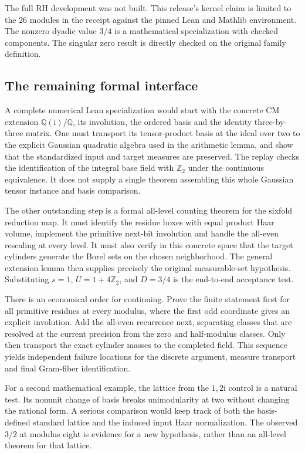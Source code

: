 \documentclass[12pt,letterpaper]{article}
\begin{document}
The full RH development was not built. This release's kernel claim is limited to the 26 modules in the receipt against the pinned Lean and Mathlib environment. The nonzero dyadic value \(3/4\) is a mathematical specialization with checked components. The singular zero result is directly checked on the original family definition.

\clearpage\subsection{The remaining formal interface}
A complete numerical Lean specialization would start with the concrete CM extension \(\mathbb Q(\mathrm i)/\mathbb Q\), its involution, the ordered basis and the identity three-by-three matrix. One must transport its tensor-product basis at the ideal over two to the explicit Gaussian quadratic algebra used in the arithmetic lemma, and show that the standardized input and target measures are preserved. The replay checks the identification of the integral base field with \(\mathbb Z_2\) under the continuous equivalence. It does not supply a single theorem assembling this whole Gaussian tensor instance and basis comparison.

The other outstanding step is a formal all-level counting theorem for the sixfold reduction map. It must identify the residue boxes with equal product Haar volume, implement the primitive next-bit involution and handle the all-even rescaling at every level. It must also verify in this concrete space that the target cylinders generate the Borel sets on the chosen neighborhood. The general extension lemma then supplies precisely the original measurable-set hypothesis. Substituting \(s=1\), \(U=1+4\mathbb Z_2\), and \(D=3/4\) is the end-to-end acceptance test.

There is an economical order for continuing. Prove the finite statement first for all primitive residues at every modulus, where the first odd coordinate gives an explicit involution. Add the all-even recurrence next, separating classes that are resolved at the current precision from the zero and half-modulus classes. Only then transport the exact cylinder masses to the completed field. This sequence yields independent failure locations for the discrete argument, measure transport and final Gram-fiber identification.

For a second mathematical example, the lattice from the \(1,2\mathrm i\) control is a natural test. Its nonunit change of basis breaks unimodularity at two without changing the rational form. A serious comparison would keep track of both the basis-defined standard lattice and the induced input Haar normalization. The observed \(3/2\) at modulus eight is evidence for a new hypothesis, rather than an all-level theorem for that lattice.
\end{document}
